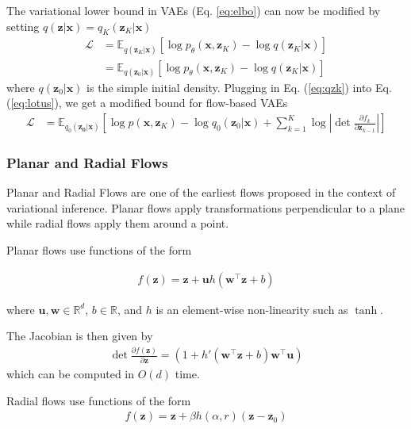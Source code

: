 \documentclass[runningheads]{llncs}
\begin{document}
The variational lower bound in VAEs (Eq. \ref{eq:elbo}) can now be modified by setting $q(\mathbf{z}|\mathbf{x}) = q_K(\mathbf{z}_K|\mathbf{x})$
\begin{align}
\mathcal{L} &= \mathbb{E}_{q(\mathbf{z}_K|\mathbf{x})}\left[\log p_\theta(\mathbf{x}, \mathbf{z}_K) - \log q(\mathbf{z}_K|\mathbf{x})\right]\\
&= \mathbb{E}_{q(\mathbf{z}_0|\mathbf{x})}\left[\log p_\theta(\mathbf{x}, \mathbf{z}_K) - \log q(\mathbf{z}_K|\mathbf{x})\right]\label{eq:lotus}
\end{align}
where $q(\mathbf{z}_0|\mathbf{x})$ is the simple initial density. Plugging in Eq. (\ref{eq:qzk}) into Eq. (\ref{eq:lotus}), we get a modified bound for flow-based VAEs
\begin{align}
\mathcal{L} &= \mathbb{E}_{q_0(\mathbf{z_0}|\mathbf{x})}\left[\log p(\mathbf{x},\mathbf{z}_K) - \log q_0(\mathbf{z}_0|\mathbf{x}) + \sum_{k=1}^K\log\left|\det \frac{\partial f_k}{\partial \mathbf{z}_{k-1}}\right| \right]
\end{align}
\subsubsection{Planar and Radial Flows} 
Planar and Radial Flows \cite{rezende2015variational} are one of the earliest flows proposed in the context of variational inference. Planar flows apply transformations perpendicular to a plane while radial flows apply them around a point. 

Planar flows use functions of the form

\begin{align}
f(\mathbf{z}) = \mathbf{z} + \mathbf{u}h(\mathbf{w}^\top\mathbf{z} + b)
\label{eq:planarfn}
\end{align}

where $\mathbf{u},\mathbf{w}\in \mathbb{R}^d$, $b \in \mathbb{R}$, and $h$ is an element-wise non-linearity such as $\tanh$.

The Jacobian is then given by
\begin{align}
\det\frac{\partial f(\mathbf{z})}{\partial \mathbf{z}} =(1 + h'(\mathbf{w}^\top\mathbf{z} + b)\mathbf{w}^\top\mathbf{u})
\end{align}
which can be computed in $O(d)$ time.

Radial flows use functions of the form
\begin{align}
f(\mathbf{z}) = \mathbf{z} + \beta h(\alpha,r)(\mathbf{z}-\mathbf{z}_0)
\label{eq:radialfn}
\end{align}
\end{document}
